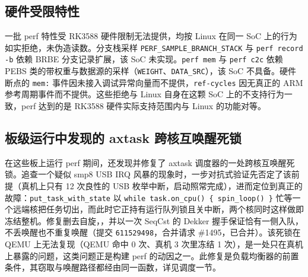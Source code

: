 \subsection{硬件受限特性}

一批 perf 特性受 RK3588 硬件限制无法提供，均按 Linux 在同一 SoC 上的行为如实拒绝，未伪造读数。分支栈采样 \texttt{PERF\_SAMPLE\_BRANCH\_STACK} 与 \texttt{perf record -b} 依赖 BRBE 分支记录扩展，该 SoC 未实现。\texttt{perf mem} 与 \texttt{perf c2c} 依赖 PEBS 类的带权重与数据源的采样（\texttt{WEIGHT}、\texttt{DATA\_SRC}），该 SoC 不具备。硬件断点的 \texttt{mem:} 事件因未接入调试异常向量而不提供，\texttt{ref-cycles} 因无真正的 ARM 参考周期事件而不提供。这些拒绝与 Linux 自身在这颗 SoC 上的不支持行为一致，perf 达到的是 RK3588 硬件实际支持范围内与 Linux 的功能对等。

\subsection{板级运行中发现的 axtask 跨核互唤醒死锁}

在这些板上运行 perf 期间，还发现并修复了 axtask 调度器的一处跨核互唤醒死锁。追查一个疑似 smp8 USB IRQ 风暴的现象时，一步对抗式验证先否定了该前提（真机上只有 12 次良性的 USB 枚举中断，启动照常完成），进而定位到真正的故障：\texttt{put\_task\_with\_state} 以 \texttt{while task.on\_cpu() \{ spin\_loop() \}} 忙等一个远端核把任务切出，而此时它正持有运行队列锁且关中断，两个核同时这样做即冻结整机。修复删去自旋，，并以一次 SeqCst 的 Dekker 握手保证恰有一侧入队，不丢唤醒也不重复唤醒（提交 \texttt{611529498}，合并请求 \#1495，已合并）。该死锁在 QEMU 上无法复现（QEMU 命中 0 次、真机 3 次里冻结 1 次），是一处只在真机上暴露的问题，这类问题正是构建 perf 的动因之一。此修复是负载均衡器的前置条件，其窃取与唤醒路径都经由同一函数，详见调度一节。
